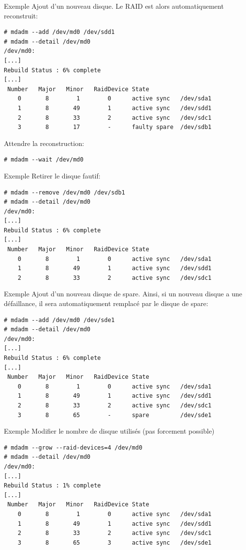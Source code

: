 \begin{frame}[fragile=singleslide]{Exemple}
  Ajout  d'un  nouveau  disque.   Le RAID  est  alors  automatiquement
  reconstruit:
  \begin{lstlisting}
# mdadm --add /dev/md0 /dev/sdd1
# mdadm --detail /dev/md0
/dev/md0:
[...]
Rebuild Status : 6% complete
[...]
 Number   Major   Minor   RaidDevice State
    0       8        1        0      active sync   /dev/sda1
    1       8       49        1      active sync   /dev/sdd1
    2       8       33        2      active sync   /dev/sdc1
    3       8       17        -      faulty spare  /dev/sdb1
  \end{lstlisting}
  Attendre la reconstruction:
  \begin{lstlisting}
# mdadm --wait /dev/md0
  \end{lstlisting}
\end{frame}

\begin{frame}[fragile=singleslide]{Exemple}
  Retirer le disque fautif:
  \begin{lstlisting}
# mdadm --remove /dev/md0 /dev/sdb1
# mdadm --detail /dev/md0
/dev/md0:
[...]
Rebuild Status : 6% complete
[...]
 Number   Major   Minor   RaidDevice State
    0       8        1        0      active sync   /dev/sda1
    1       8       49        1      active sync   /dev/sdd1
    2       8       33        2      active sync   /dev/sdc1
  \end{lstlisting}
\end{frame}

\begin{frame}[fragile=singleslide]{Exemple}
  Ajout d'un nouveau  disque de spare.  Ainsi, si  un nouveau disque a
  une défaillance,  il sera automatiquement remplacé par  le disque de
  spare:
  \begin{lstlisting}
# mdadm --add /dev/md0 /dev/sde1
# mdadm --detail /dev/md0
/dev/md0:
[...]
Rebuild Status : 6% complete
[...]
 Number   Major   Minor   RaidDevice State
    0       8        1        0      active sync   /dev/sda1
    1       8       49        1      active sync   /dev/sdd1
    2       8       33        2      active sync   /dev/sdc1
    3       8       65        -      spare         /dev/sde1
  \end{lstlisting}
\end{frame}

\begin{frame}[fragile=singleslide]{Exemple}
  Modifier le nombre de disque utilisés (pas forcement possible)
  \begin{lstlisting}
# mdadm --grow --raid-devices=4 /dev/md0
# mdadm --detail /dev/md0
/dev/md0:
[...]
Rebuild Status : 1% complete
[...]
 Number   Major   Minor   RaidDevice State
    0       8        1        0      active sync   /dev/sda1
    1       8       49        1      active sync   /dev/sdd1
    2       8       33        2      active sync   /dev/sdc1
    3       8       65        3      active sync   /dev/sde1
  \end{lstlisting}
\end{frame}
